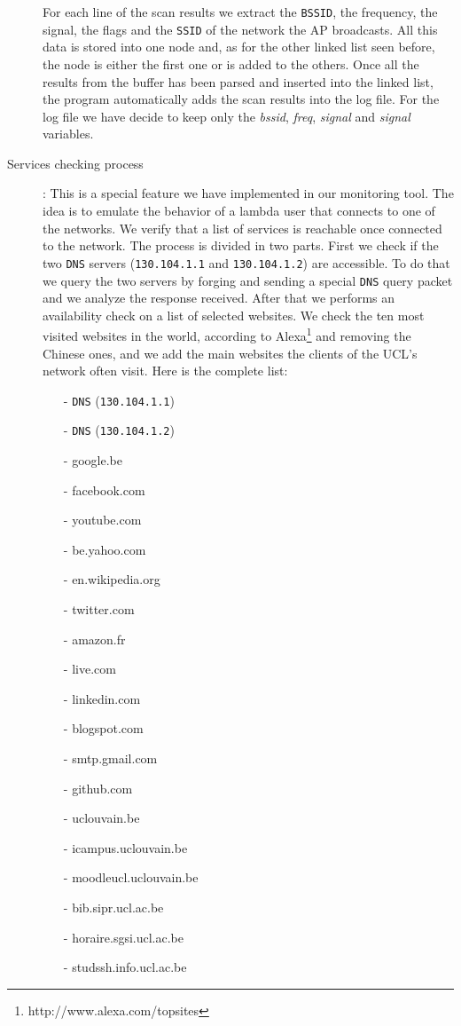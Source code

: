 \begin{description}
	For each line of the scan results we extract the \texttt{BSSID}, the frequency, the signal, the flags and the \texttt{SSID} of the network the AP broadcasts. All this data is stored into one node and, as for the other linked list seen before, the node is either the first one or is added to the others. Once all the results from the buffer has been parsed and inserted into the linked list, the program automatically adds the scan results into the log file. For the log file we have decide to keep only the \textit{bssid}, \textit{freq}, \textit{signal} and \textit{signal} variables.

	\item[Services checking process]: This is a special feature we have implemented in our monitoring tool. The idea is to emulate the behavior of a lambda user that connects to one of the networks. We verify that a list of services is reachable once connected to the network. The process is divided in two parts. First we check if the two \texttt{DNS} servers (\texttt{130.104.1.1} and \texttt{130.104.1.2}) are accessible. To do that we query the two servers by forging and sending a special \texttt{DNS} query packet and we analyze the response received. After that we performs an availability check on a list of selected websites. We check the ten most visited websites in the world, according to Alexa\footnote{http://www.alexa.com/topsites} and removing the Chinese ones, and we add the main websites the clients of the UCL's network often visit. Here is the complete list:
	\begin{itemize}
		\item[-] \texttt{DNS} (\texttt{130.104.1.1})
		\item[-] \texttt{DNS} (\texttt{130.104.1.2})
		\item[-] google.be
		\item[-] facebook.com
		\item[-] youtube.com
		\item[-] be.yahoo.com
		\item[-] en.wikipedia.org
		\item[-] twitter.com
		\item[-] amazon.fr
		\item[-] live.com
		\item[-] linkedin.com
		\item[-] blogspot.com
		\item[-] smtp.gmail.com
		\item[-] github.com
		\item[-] uclouvain.be
		\item[-] icampus.uclouvain.be
		\item[-] moodleucl.uclouvain.be
		\item[-] bib.sipr.ucl.ac.be
		\item[-] horaire.sgsi.ucl.ac.be
		\item[-] studssh.info.ucl.ac.be
	\end{itemize}


\end{description}
